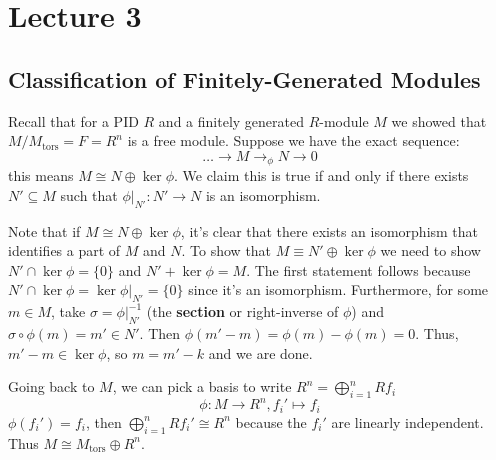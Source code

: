 \section{Lecture 3}

\subsection{Classification of Finitely-Generated Modules}
Recall that for a PID $R$ and a finitely generated $R$-module $M$ we showed that $M/M_{\text{tors}} = F = R^n$ is
a free module. Suppose we have the exact sequence:
\[ \dots \to M \to_{\phi} N \to 0 \]
this means $M \cong N \oplus \ker \phi$. We claim this is true if and only if
there exists $N' \subseteq M$ such that $\phi\Big|_{N'}: N' \to N$ is an isomorphism.

Note that if $M \cong N \oplus \ker \phi$, it's clear that there exists an isomorphism that identifies a part of $M$ and $N$. To show that $M \equiv N' \oplus \ker \phi$ we need to show $N' \cap \ker \phi = \{0\}$ and $N' + \ker \phi = M$.
The first statement follows because $N' \cap \ker \phi = \ker \phi \Big|_{N'} = \{0\}$ since it's an isomorphism.
Furthermore, for some $m \in M$, take $\sigma = \phi|_{N'}^{-1}$ (the \textbf{section} or right-inverse of $\phi$) and $\sigma \circ \phi(m) = m' \in N'$. Then $\phi(m' - m) = \phi(m) - \phi(m) = 0$.
Thus, $m' - m \in \ker \phi$, so $m = m' - k$ and we are done.

Going back to $M$, we can pick a basis to write $R^n = \bigoplus_{i = 1}^n Rf_i$
\[ \phi: M \to R^n, f_i' \mapsto f_i\]
$\phi(f_i') = f_i$, then $\bigoplus_{i = 1}^n Rf_i' \cong R^n$ because the $f_i'$ are linearly independent. Thus $M \cong M_{\text{tors}} \oplus R^n$.

